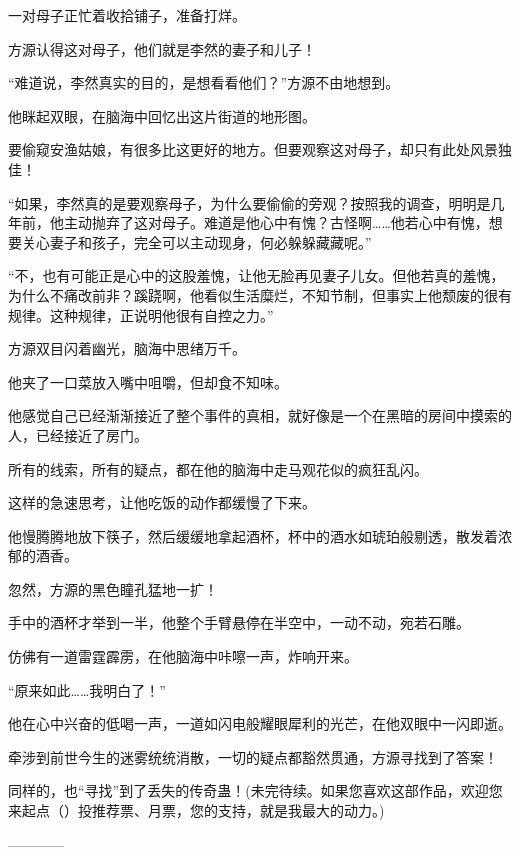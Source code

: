 \begin{this_body}
一对母子正忙着收拾铺子，准备打烊。

方源认得这对母子，他们就是李然的妻子和儿子！

“难道说，李然真实的目的，是想看看他们？”方源不由地想到。

他眯起双眼，在脑海中回忆出这片街道的地形图。

要偷窥安渔姑娘，有很多比这更好的地方。但要观察这对母子，却只有此处风景独佳！

“如果，李然真的是要观察母子，为什么要偷偷的旁观？按照我的调查，明明是几年前，他主动抛弃了这对母子。难道是他心中有愧？古怪啊……他若心中有愧，想要关心妻子和孩子，完全可以主动现身，何必躲躲藏藏呢。”

“不，也有可能正是心中的这股羞愧，让他无脸再见妻子儿女。但他若真的羞愧，为什么不痛改前非？蹊跷啊，他看似生活糜烂，不知节制，但事实上他颓废的很有规律。这种规律，正说明他很有自控之力。”

方源双目闪着幽光，脑海中思绪万千。

他夹了一口菜放入嘴中咀嚼，但却食不知味。

他感觉自己已经渐渐接近了整个事件的真相，就好像是一个在黑暗的房间中摸索的人，已经接近了房门。

所有的线索，所有的疑点，都在他的脑海中走马观花似的疯狂乱闪。

这样的急速思考，让他吃饭的动作都缓慢了下来。

他慢腾腾地放下筷子，然后缓缓地拿起酒杯，杯中的酒水如琥珀般剔透，散发着浓郁的酒香。

忽然，方源的黑色瞳孔猛地一扩！

手中的酒杯才举到一半，他整个手臂悬停在半空中，一动不动，宛若石雕。

仿佛有一道雷霆霹雳，在他脑海中咔嚓一声，炸响开来。

“原来如此……我明白了！”

他在心中兴奋的低喝一声，一道如闪电般耀眼犀利的光芒，在他双眼中一闪即逝。

牵涉到前世今生的迷雾统统消散，一切的疑点都豁然贯通，方源寻找到了答案！

同样的，也“寻找”到了丢失的传奇蛊！(未完待续。如果您喜欢这部作品，欢迎您来起点（）投推荐票、月票，您的支持，就是我最大的动力。)

------------

\end{this_body}

